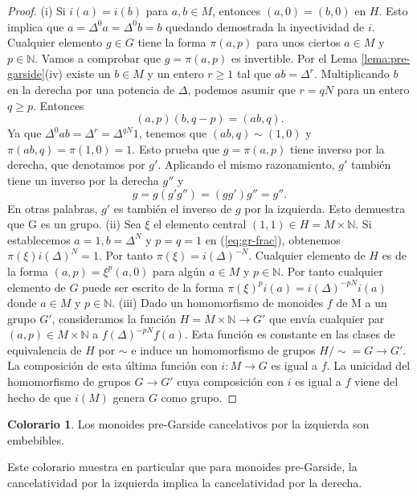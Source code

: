 \documentclass[12pt]{book}
\theoremstyle{definition}
\newtheorem{colo}{Colorario}[section]
\begin{document}
\begin{proof} (i) Si $i(a)=i(b)$ para $a,b\in M$, entonces $(a,0)=(b,0)$ en $H$. Esto implica que $a=\Delta^0a=\Delta^0b=b$ quedando demostrada la inyectividad de $i$.
\newline
\newline
Cualquier elemento $g\in G$ tiene la forma $\pi(a,p)$ para unos ciertos $a\in M$ y $p\in\mathbb{N}$. Vamos a comprobar que $g=\pi(a,p)$ es invertible. Por el Lema \ref{lema:pre-garside}(iv) existe un $b\in M$ y un entero $r\geq 1$ tal que $ab=\Delta^r$. Multiplicando $b$ en la derecha por una potencia de $\Delta$, podemos asumir que $r=qN$ para un entero $q\geq p$. Entonces
\begin{equation}
(a,p)(b,q-p)=(ab,q).
\label{eq:gr-frac}
\end{equation}
Ya que $\Delta^0ab=\Delta^r=\Delta^{qN}1$, tenemos que $(ab,q)\sim(1,0)$ y $\pi(ab,q)=\pi(1,0)=1$. Esto prueba que $g=\pi(a,p)$ tiene inverso por la derecha, que denotamos por $g'$. Aplicando el mismo razonamiento, $g'$ también tiene un inverso por la derecha  $g''$ y
$$g=g(g'g'')=(gg')g''=g''.$$
En otras palabras, $g'$ es también el inverso de $g$ por la izquierda. Esto demuestra que G es un grupo.
\newline
\newline
(ii) Sea $\xi$ el elemento central $(1,1)\in H=M\times\mathbb{N}$. Si establecemos $a=1,b=\Delta^N$ y $p=q=1$ en (\ref{eq:gr-frac}), obtenemos $\pi(\xi)i(\Delta)^N=1$. Por tanto $\pi(\xi)=i(\Delta)^{-N}$. Cualquier elemento de $H$ es de la forma $(a,p)=\xi^p(a,0)$ para algún $a\in M$ y $p\in\mathbb{N}$. Por tanto cualquier elemento de $G$ puede ser escrito de la forma $\pi(\xi)^pi(a)=i(\Delta)^{-pN}i(a)$ donde $a\in M$ y $p\in\mathbb{N}$.
\newline
\newline
(iii) Dado un homomorfismo de monoides $f$ de M a un grupo $G'$, consideramos la función $H=M\times \mathbb{N}\rightarrow G'$ que envía cualquier par $(a,p)\in M\times \mathbb{N}$ a $f(\Delta)^{-pN}f(a)$. Esta función es constante en las clases de equivalencia de $H$ por $\sim$ e induce un homomorfismo de grupos $H/\sim=G\rightarrow G'$. La composición de esta última función con $i:M\rightarrow G$ es igual a $f$. La unicidad del homomorfismo de grupos $G\rightarrow G'$ cuya composición con $i$ es igual a $f$ viene del hecho de que $i(M)$ genera $G$ como grupo.
\end{proof}

\begin{colo}
Los monoides pre-Garside cancelativos por la izquierda son embebibles.
\label{colo:pre-garside-embe}
\end{colo}
Este colorario muestra en particular que para monoides pre-Garside, la cancelatividad por la izquierda implica la cancelatividad por la derecha.
\end{document}
